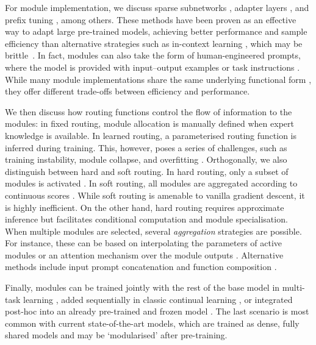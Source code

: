 \documentclass[10pt]{article} %
\begin{document}
For module implementation, we discuss sparse subnetworks \citep{hu2021lora,ansell2021composable}, adapter layers \citep{Rebuffi2018Adapters2,pfeiffer-etal-2020-mad}, and prefix tuning \citep{Li2020PrefixTuning}, among others. These methods have been proven as an effective way to adapt large pre-trained models, achieving better performance and sample efficiency than alternative strategies such as in-context learning \citep{Liu2022IA3}, which may be brittle~\citep{lu-etal-2022-fantastically}. In fact, modules can also take the form of human-engineered prompts, where the model is provided with input--output examples \citep{brown2020language} or task instructions \citep{wei2022finetuned}. While many module implementations share the same underlying functional form \citep{he-etal-2021-effectiveness}, they offer different trade-offs between efficiency and performance.

We then discuss how routing functions control the flow of information to the modules: in fixed routing, module allocation is manually defined when expert knowledge is available\citep[\textit{inter alia}]{hampshire1992meta,rajendran2017adaapt}. In learned routing, a parameterised routing function is inferred during training. This, however, poses a series of challenges, such as training instability, module collapse, and overfitting \citep{rosenbaum2019routing}. Orthogonally, we also distinguish between hard and soft routing. In hard routing, only a subset of modules is activated \citep[\textit{inter alia}]{rosenbaum2017routing,ponti2022combining,fernando2017pathnet}. In soft routing, all modules are aggregated according to continuous scores \citep{jacobs1991adaptive,Jordan1994Hierarchical}. While soft routing is amenable to vanilla gradient descent, it is highly inefficient. On the other hand, hard routing requires approximate inference but facilitates conditional computation and module specialisation.
When multiple modules are selected, several \textit{aggregation} strategies are possible. 
For instance, these can be based on interpolating the parameters of active modules \citep{ansell2021composable} or an attention mechanism over the module outputs \citep{pfeiffer2020adapterfusion}. Alternative methods include input prompt concatenation \citep{vu-etal-2022-overcoming} and function composition \citep{andreas2016nmn}.

Finally, modules can be trained jointly with the rest of the base model in multi-task learning \citep{caruana1997multitask,ruder2017overview}, added sequentially in classic continual learning \citep{Rusu2016Progressive}, or integrated post-hoc into an already pre-trained and frozen model \citep{Rebuffi2017Adapters1,houlsby2019parameter}. The last scenario is most common with current state-of-the-art models, which are trained as dense, fully shared models and may be `modularised' after pre-training.
\end{document}
